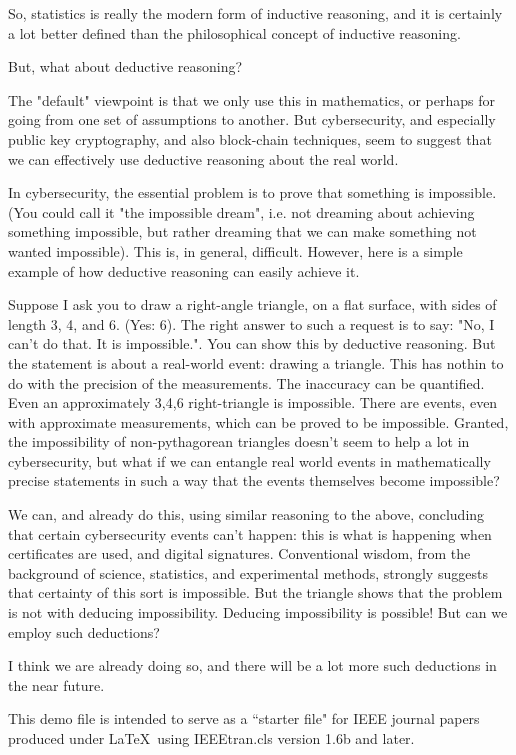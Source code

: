 \documentclass[journal]{IEEEtran}
\begin{document}
So, statistics is really the modern form of inductive reasoning, and
it is certainly a lot better defined than the philosophical concept of
inductive reasoning.

But, what about deductive reasoning?

The "default" viewpoint is that we only use this in mathematics,
or perhaps for going from one set of assumptions to another. But
cybersecurity, and especially public key cryptography, and also
block-chain techniques, seem to suggest that we can effectively use
deductive reasoning about the real world.

In cybersecurity, the essential problem is to prove that something is
impossible. (You could call it "the impossible dream", i.e. not dreaming
about achieving something impossible, but rather dreaming that we can make
something not wanted impossible). This is, in general, difficult. However,
here is a simple example of how deductive reasoning can easily achieve it.

Suppose I ask you to draw a right-angle triangle, on a flat surface, with
sides of length 3, 4, and 6. (Yes: 6). The right answer to such a request
is to say: "No, I can't do that. It is impossible.". You can show this
by deductive reasoning. But the statement is about a real-world event:
drawing a triangle. This has nothin to do with the precision of the
measurements. The inaccuracy can be quantified. Even an approximately
3,4,6 right-triangle is impossible. There are events, even with
approximate measurements, which can be proved to be impossible. Granted,
the impossibility of non-pythagorean triangles doesn't seem to help a
lot in cybersecurity, but what if we can entangle real world events in
mathematically precise statements in such a way that the events themselves
become impossible?

We can, and already do this, using similar reasoning to the above,
concluding that certain cybersecurity events can't happen: this
is what is happening when certificates are used, and digital
signatures. Conventional wisdom, from the background of science,
statistics, and experimental methods, strongly suggests that certainty
of this sort is impossible. But the triangle shows that the problem is
not with deducing impossibility. Deducing impossibility is possible! But
can we employ such deductions?

I think we are already doing so, and there will be a lot more such deductions in the near future.


This demo file is intended to serve as a ``starter file"
for IEEE journal papers produced under \LaTeX\ using IEEEtran.cls version
1.6b and later.
\end{document}
